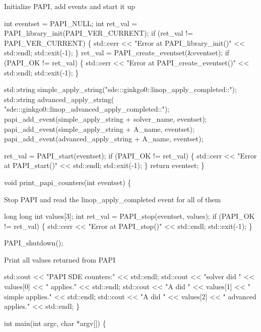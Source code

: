 Initialize P\+A\+PI, add events and start it up


\begin{DoxyCode}
    \textcolor{keywordtype}{int} eventset = PAPI\_NULL;
    \textcolor{keywordtype}{int} ret\_val = PAPI\_library\_init(PAPI\_VER\_CURRENT);
    \textcolor{keywordflow}{if} (ret\_val != PAPI\_VER\_CURRENT) \{
        std::cerr << \textcolor{stringliteral}{"Error at PAPI\_library\_init()"} << std::endl;
        std::exit(-1);
    \}
    ret\_val = PAPI\_create\_eventset(&eventset);
    \textcolor{keywordflow}{if} (PAPI\_OK != ret\_val) \{
        std::cerr << \textcolor{stringliteral}{"Error at PAPI\_create\_eventset()"} << std::endl;
        std::exit(-1);
    \}

    std::string simple\_apply\_string(\textcolor{stringliteral}{"sde:::ginkgo0::linop\_apply\_completed::"});
    std::string advanced\_apply\_string(
        \textcolor{stringliteral}{"sde:::ginkgo0::linop\_advanced\_apply\_completed::"});
    papi\_add\_event(simple\_apply\_string + solver\_name, eventset);
    papi\_add\_event(simple\_apply\_string + A\_name, eventset);
    papi\_add\_event(advanced\_apply\_string + A\_name, eventset);

    ret\_val = PAPI\_start(eventset);
    \textcolor{keywordflow}{if} (PAPI\_OK != ret\_val) \{
        std::cerr << \textcolor{stringliteral}{"Error at PAPI\_start()"} << std::endl;
        std::exit(-1);
    \}
    \textcolor{keywordflow}{return} eventset;
\}


\textcolor{keywordtype}{void} print\_papi\_counters(\textcolor{keywordtype}{int} eventset)
\{
\end{DoxyCode}


Stop P\+A\+PI and read the linop\+\_\+apply\+\_\+completed event for all of them


\begin{DoxyCode}
\textcolor{keywordtype}{long} \textcolor{keywordtype}{long} \textcolor{keywordtype}{int} values[3];
\textcolor{keywordtype}{int} ret\_val = PAPI\_stop(eventset, values);
\textcolor{keywordflow}{if} (PAPI\_OK != ret\_val) \{
    std::cerr << \textcolor{stringliteral}{"Error at PAPI\_stop()"} << std::endl;
    std::exit(-1);
\}

PAPI\_shutdown();
\end{DoxyCode}


Print all values returned from P\+A\+PI


\begin{DoxyCode}
    std::cout << \textcolor{stringliteral}{"PAPI SDE counters:"} << std::endl;
    std::cout << \textcolor{stringliteral}{"solver did "} << values[0] << \textcolor{stringliteral}{" applies."} << std::endl;
    std::cout << \textcolor{stringliteral}{"A did "} << values[1] << \textcolor{stringliteral}{" simple applies."} << std::endl;
    std::cout << \textcolor{stringliteral}{"A did "} << values[2] << \textcolor{stringliteral}{" advanced applies."} << std::endl;
\}


\textcolor{keywordtype}{int} main(\textcolor{keywordtype}{int} argc, \textcolor{keywordtype}{char} *argv[])
\{
\end{DoxyCode}



